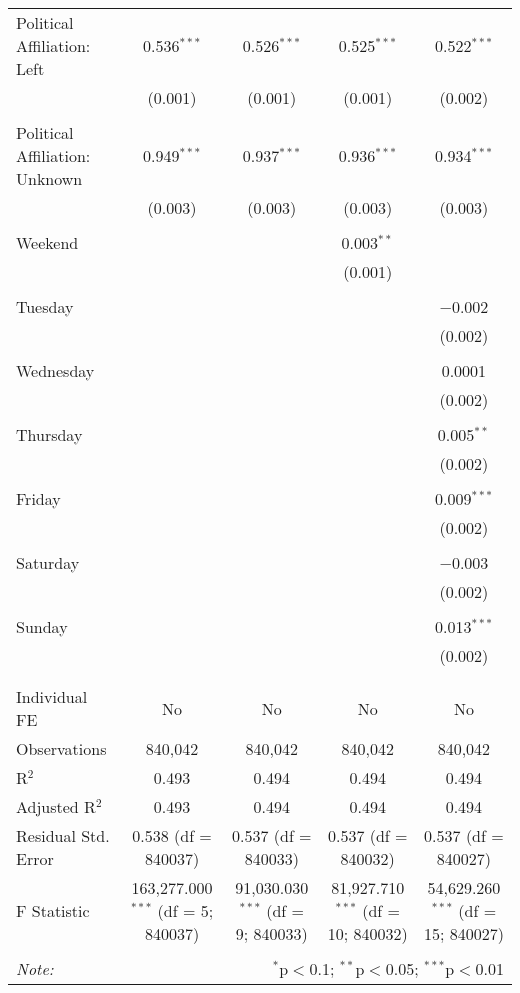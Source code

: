 \documentclass[
]{article}
\begin{document}
\begin{table}[!htbp]
{\begin{tabular}{@{\extracolsep{5pt}}lcccc}
 Political Affiliation: Left & 0.536$^{***}$ & 0.526$^{***}$ & 0.525$^{***}$ & 0.522$^{***}$ \\ 
  & (0.001) & (0.001) & (0.001) & (0.002) \\ 
  & & & & \\ 
 Political Affiliation: Unknown & 0.949$^{***}$ & 0.937$^{***}$ & 0.936$^{***}$ & 0.934$^{***}$ \\ 
  & (0.003) & (0.003) & (0.003) & (0.003) \\ 
  & & & & \\ 
 Weekend &  &  & 0.003$^{**}$ &  \\ 
  &  &  & (0.001) &  \\ 
  & & & & \\ 
 Tuesday &  &  &  & $-$0.002 \\ 
  &  &  &  & (0.002) \\ 
  & & & & \\ 
 Wednesday &  &  &  & 0.0001 \\ 
  &  &  &  & (0.002) \\ 
  & & & & \\ 
 Thursday &  &  &  & 0.005$^{**}$ \\ 
  &  &  &  & (0.002) \\ 
  & & & & \\ 
 Friday &  &  &  & 0.009$^{***}$ \\ 
  &  &  &  & (0.002) \\ 
  & & & & \\ 
 Saturday &  &  &  & $-$0.003 \\ 
  &  &  &  & (0.002) \\ 
  & & & & \\ 
 Sunday &  &  &  & 0.013$^{***}$ \\ 
  &  &  &  & (0.002) \\ 
  & & & & \\ 
\hline \\[-1.8ex] 
Individual FE & No & No & No & No \\ 
Observations & 840,042 & 840,042 & 840,042 & 840,042 \\ 
R$^{2}$ & 0.493 & 0.494 & 0.494 & 0.494 \\ 
Adjusted R$^{2}$ & 0.493 & 0.494 & 0.494 & 0.494 \\ 
Residual Std. Error & 0.538 (df = 840037) & 0.537 (df = 840033) & 0.537 (df = 840032) & 0.537 (df = 840027) \\ 
F Statistic & 163,277.000$^{***}$ (df = 5; 840037) & 91,030.030$^{***}$ (df = 9; 840033) & 81,927.710$^{***}$ (df = 10; 840032) & 54,629.260$^{***}$ (df = 15; 840027) \\ 
\hline 
\hline \\[-1.8ex] 
\textit{Note:}  & \multicolumn{4}{r}{$^{*}$p$<$0.1; $^{**}$p$<$0.05; $^{***}$p$<$0.01} \\ 
\end{tabular}
} 
\end{table} 
\newpage
\end{document}
